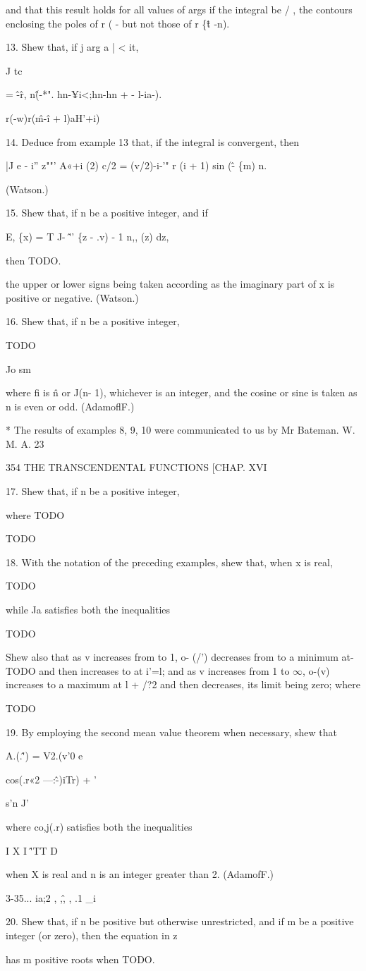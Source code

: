 and that this result holds for all values of args if the integral be /
, the contours enclosing the poles of r ( - but not those of r \{\^t
-n).

13. Shew that, if j arg a | < it,

J tc

= \^-\^ r, n\^(-*". hn-¥i<;hn-hn + - l-ia-).

r(-w)r(\^m-\^i + l)aH'+i)

14. Deduce from example 13 that, if the integral is convergent, then

|J e - i'' z""' A«+i (2) c/2 = (v/2)-i-'" r (i + 1) sin (\^ - \{m) n.

(Watson.)

15. Shew that, if n be a positive integer, and if

E, \{x) = T J- \^'' \{z - .v) - 1 n,, (z) dz,

then TODO.

the upper or lower signs being taken according as the imaginary part
of x is positive or negative. (Watson.)

16. Shew that, if n be a positive integer,

TODO

Jo sm

where fi is \^n or J(n- 1), whichever is an integer, and the cosine or
sine is taken as n is even or odd. (AdamoflF.)

* The results of examples 8, 9, 10 were communicated to us by Mr
Bateman. W. M. A. 23

354 THE TRANSCENDENTAL FUNCTIONS [CHAP. XVI

17. Shew that, if n be a positive integer,

where TODO

TODO 

18. With the notation of the preceding examples, shew that, when x is
real,

TODO

while Ja satisfies both the inequalities

TODO

Shew also that as v increases from to 1, o- (/') decreases from to a
minimum at- TODO and then increases to at i'=l; and as v increases
from 1 to $\infty$, o-(v) increases to a maximum at l + /?2 and then
decreases, its limit being zero; where

TODO 

19. By employing the second mean value theorem when necessary, shew
that

A.(.\^') = V2.(v'0 e

cos(.r«2 —:\^-)iTr) + '

s'n J'

where co,j(.r) satisfies both the inequalities

I X I \^'TT D

when X is real and n is an integer greater than 2. (AdamofF.)

3-35... ia;2 , ,\^, , .1 \_i

20. Shew that, if n be positive but otherwise unrestricted, and if m
be a positive integer (or zero), then the equation in z

has m positive roots when TODO. 